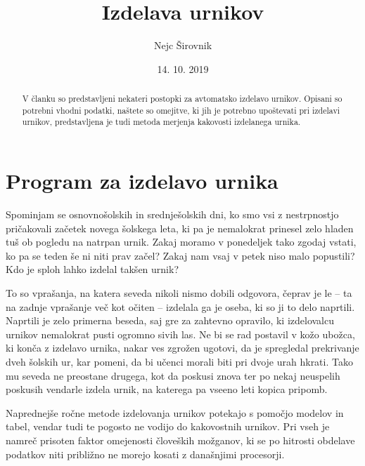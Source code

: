 \documentclass[a4paper, 10pt]{article}
\begin{document}

\title{Izdelava urnikov}
\author{Nejc Širovnik}
\date{14. 10. 2019}

\begin{abstract}
V članku so predstavljeni nekateri postopki za avtomatsko izdelavo urnikov. Opisani so
potrebni vhodni podatki, naštete so omejitve, ki jih je potrebno upoštevati pri izdelavi
urnikov, predstavljena je tudi metoda merjenja kakovosti izdelanega urnika.
\end{abstract}

\maketitle

\section{Program za izdelavo urnika}

Spominjam se osnovnošolskih in srednješolskih dni, ko smo vsi z nestrpnostjo pričakovali
začetek novega šolskega leta, ki pa je nemalokrat prinesel zelo hladen tuš ob pogledu na
natrpan urnik. Zakaj moramo v ponedeljek tako zgodaj vstati, ko pa se teden še ni niti
prav začel? Zakaj nam vsaj v petek niso malo popustili? Kdo je sploh lahko izdelal
takšen urnik?

To so vprašanja, na katera seveda nikoli nismo dobili odgovora, čeprav je le -- ta na zadnje
vprašanje več kot očiten -- izdelala ga je oseba, ki so ji to delo naprtili. Naprtili je
zelo primerna beseda, saj gre za zahtevno opravilo, ki izdelovalcu urnikov nemalokrat
pusti ogromno sivih las. Ne bi se rad postavil v kožo ubožca, ki konča z izdelavo urnika,
nakar ves zgrožen ugotovi, da je spregledal prekrivanje dveh šolskih ur, kar pomeni, da
bi učenci morali biti pri dvoje urah hkrati. Tako mu seveda ne preostane drugega, kot da
poskusi znova ter po nekaj neuspelih poskusih vendarle izdela urnik, na katerega pa vseeno
leti kopica pripomb.

Naprednejše ročne metode izdelovanja urnikov potekajo s pomočjo modelov in tabel, vendar
tudi te pogosto ne vodijo do kakovostnih urnikov. Pri vseh je namreč prisoten faktor
omejenosti človeških možganov, ki se po hitrosti obdelave podatkov niti približno ne
morejo kosati z današnjimi procesorji.
\end{document}

